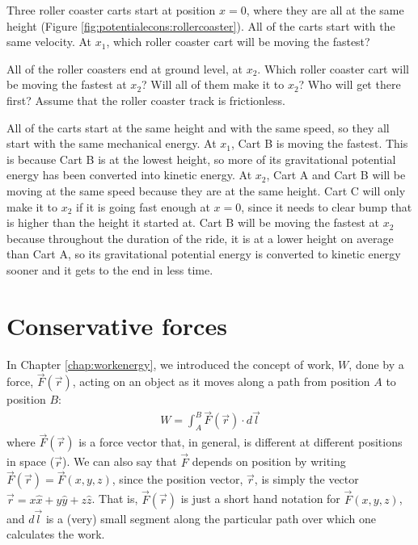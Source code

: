 \begin{opening}
Three roller coaster carts start at position $x=0$,  where they are all at the same height (Figure \ref{fig:potentialecons:rollercoaster}). All of the carts start with the same velocity. At $x_1$, which roller coaster cart will be moving the fastest? 

All of the roller coasters end at ground level, at $x_2$. Which roller coaster cart will be moving the fastest at $x_2$? Will all of them make it to $x_2$? Who will get there first?  Assume that the roller coaster track is frictionless.
\begin{answer}
All of the carts start at the same height and with the same speed, so they all start with the same mechanical energy. At $x_1$, Cart B is moving the fastest. This is because Cart B is at the lowest height, so more of its gravitational potential energy has been converted into kinetic energy. At $x_2$, Cart A and Cart B will be moving at the same speed because they are at the same height. Cart C will only make it to $x_2$ if it is going fast enough at $x=0$, since it needs to clear bump that is higher than the height it started at. Cart B will be moving the fastest at $x_2$ because throughout the duration of the ride, it is at a lower height on average than Cart A, so its gravitational potential energy is converted to kinetic energy sooner and it gets to the end in less time.   
\end{answer}
\end{opening}

\section{Conservative forces}
In Chapter \ref{chap:workenergy}, we introduced the concept of work, $W$, done by a force, $\vec F(\vec r)$, acting on an object as it moves along a path from position $A$ to position $B$:
\begin{align}
\label{eq:potentialecons:workdef}
W = \int_A^B \vec F(\vec r) \cdot d\vec l
\end{align}
where $\vec F(\vec r)$ is a force vector that, in general, is different at different positions in space ($\vec r$). We can also say that $\vec F$ depends on position by writing $\vec F(\vec r)=\vec F(x,y,z)$, since the position vector, $\vec r$, is simply the vector $\vec r = x\hat x + y \hat y+ z\hat z$. That is, $\vec F(\vec r)$ is just a short hand notation for $\vec F(x,y,z)$, and $d\vec l$ is a (very) small segment along the particular path over which one calculates the work.

